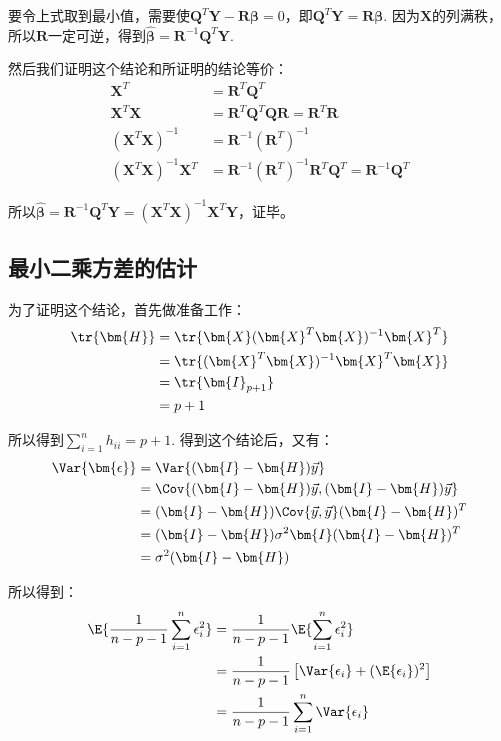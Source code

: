 \documentclass{MGLSA-cn-book-math}
\begin{document}
要令上式取到最小值，需要使$\bm{Q}^T\bm{Y}-\bm{R\beta}=0$，即$\bm{Q}^T\bm{Y}=\bm{R\beta}$. 因为$\bm{X}$的列满秩，所以$\bm{R}$一定可逆，得到$\bm{\hat\beta}=\bm{R}^{-1}\bm{Q}^T\bm{Y}$.

然后我们证明这个结论和所证明的结论等价：
\begin{align*}
	\bm{X}^T&=\bm{R}^{T}\bm{Q}^T \\
	\bm{X}^T\bm{X}&=\bm{R}^{T}\bm{Q}^T\bm{QR}=\bm{R}^T\bm{R} \\
	(\bm{X}^T\bm{X})^{-1}&=\bm{R}^{-1}(\bm{R}^T)^{-1} \\
	(\bm{X}^T\bm{X})^{-1}\bm{X}^T&=\bm{R}^{-1}(\bm{R}^T)^{-1}\bm{R}^T\bm{Q}^T=\bm{R}^{-1}\bm{Q}^T
\end{align*}

所以$\bm{\hat\beta}=\bm{R}^{-1}\bm{Q}^T\bm{Y}=(\bm{X}^T\bm{X})^{-1}\bm{X}^T\bm{Y}$，证毕。
\subsection{最小二乘方差的估计}
\label{proof:LSE-var-estimate}
为了证明这个结论，首先做准备工作：
\begin{align*}
	\tr{\bm{H}}&=\tr{\bm{X}(\bm{X}^T\bm{X})^{-1}\bm{X}^T} \\
	&=\tr{(\bm{X}^T\bm{X})^{-1}\bm{X}^T\bm{X}} \\
	&=\tr{\bm{I}_{p+1}} \\
	&=p+1
\end{align*}

所以得到$\sum_{i=1}^nh_{ii}=p+1$. 得到这个结论后，又有：
\begin{align*}
	\Var{\bm{\epsilon}}&=\Var{(\bm{I}-\bm{H})\vec{y}} \\
	&=\Cov{(\bm{I}-\bm{H})\vec{y}, (\bm{I}-\bm{H})\vec{y}} \\
	&=(\bm{I}-\bm{H})\Cov{\vec{y}, \vec{y}}(\bm{I}-\bm{H})^T \\
	&=(\bm{I}-\bm{H})\sigma^2\bm{I}(\bm{I}-\bm{H})^T \\
	&=\sigma^2(\bm{I}-\bm{H})
\end{align*}

所以得到：
\begin{align*}
	\E{\frac{1}{n-p-1}\sum_{i=1}^n\epsilon_i^2}&=\frac{1}{n-p-1}\E{\sum_{i=1}^n\epsilon_i^2} \\
	&=\frac{1}{n-p-1}\left[\Var{\epsilon_i}+(\E{\epsilon_i})^2\right] \\
	&=\frac{1}{n-p-1}\sum_{i=1}^n\Var{\epsilon_i}
\end{align*}
\end{document}

